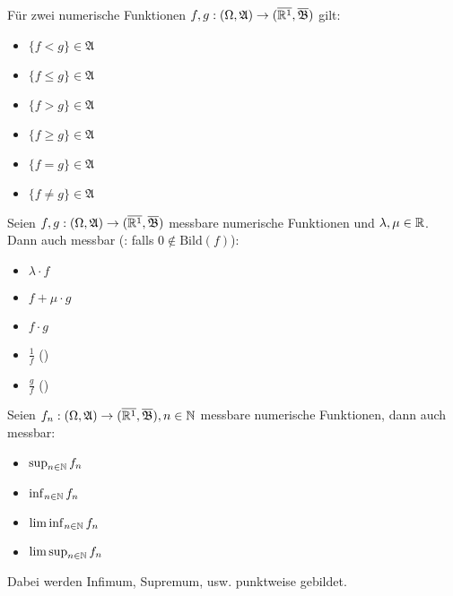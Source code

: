 \documentclass{cheat-sheet}
\newcommand{\Alg}{\mathfrak{A}} %
\newcommand{\Bor}{\mathfrak{B}} %
\renewcommand{\ER}{\overline{\R^1}} %
\begin{document}
\begin{satz}
  Für zwei numerische Funktionen $f, g : (\Omega, \Alg) \to (\ER, \overline{\Bor})$ gilt:
  \begin{multicols}{3}
    \begin{itemize}
      \item $\{ f < g \} \in \Alg$
      \item $\{ f \leq g \} \in \Alg$
      \item $\{ f > g \} \in \Alg$
      \item $\{ f \geq g \} \in \Alg$
      \item $\{ f = g \} \in \Alg$
      \item $\{ f \not= g \} \in \Alg$
    \end{itemize}
  \end{multicols}
\end{satz}

\begin{satz}
  Seien $f, g : (\Omega, \Alg) \to (\ER, \overline{\Bor})$ messbare numerische Funktionen und $\lambda, \mu \in \mathbb{R}$. Dann auch messbar (\ddag: falls $0 \not\in \mathrm{Bild}(f)$):
  \begin{multicols}{5}
    \begin{itemize}
      \item $\lambda \cdot f$
      \item $f + \mu \cdot g$
      \item $f \cdot g$
      \item $\tfrac{1}{f}$ (\ddag)
      \item $\tfrac{g}{f}$ (\ddag)
    \end{itemize}
  \end{multicols}
\end{satz}

\begin{satz}
  Seien $f_n : (\Omega, \Alg) \to (\ER, \overline{\Bor}), n \in \N$ messbare numerische Funktionen, dann auch messbar:
  \begin{multicols}{4}
    \begin{itemize}
      \item $\sup_{n \in \mathbb{N}} f_n$
      \item $\inf_{n \in \mathbb{N}} f_n$
      \item $\liminf_{n \in \mathbb{N}} f_n$
      \item $\limsup_{n \in \mathbb{N}} f_n$
    \end{itemize}
  \end{multicols}
  \vspace{4pt}
  Dabei werden Infimum, Supremum, usw. punktweise gebildet.
\end{satz}
\end{document}
